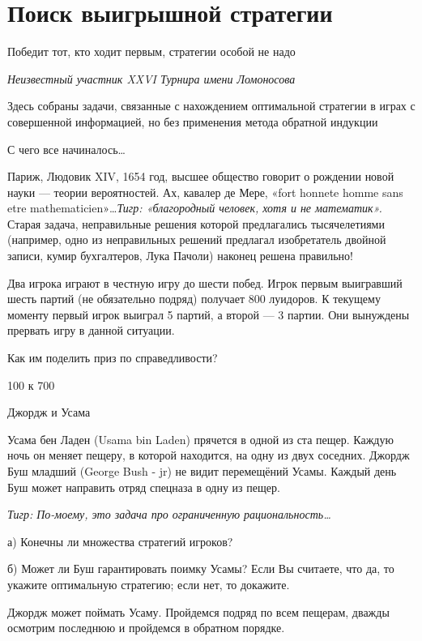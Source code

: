 



\section{Поиск выигрышной стратегии}
Победит тот, кто ходит первым, стратегии особой не надо

{\it Неизвестный участник  XXVI  Турнира имени Ломоносова}


Здесь собраны задачи, связанные с нахождением оптимальной стратегии в играх с совершенной информацией, но без применения метода обратной индукции


\begin{problem}
 С чего все начиналось\ldots \par
Париж, Людовик XIV, 1654 год, высшее общество говорит о рождении новой науки — теории вероятностей. Ах, кавалер де Мере, «fort honnete homme sans etre mathematicien»\ldots {\it Тигр:  «благородный человек, хотя и не математик».} Старая задача, неправильные решения которой предлагались тысячелетиями (например, одно из неправильных решений предлагал изобретатель двойной записи, кумир бухгалтеров, Лука Пачоли) наконец решена правильно!\par
Два игрока играют в честную игру до шести побед. Игрок первым выигравший шесть партий (не обязательно подряд) получает 800 луидоров. К текущему моменту первый игрок выиграл 5 партий, а второй — 3 партии. Они вынуждены прервать игру в данной ситуации.\par
Как им поделить приз по справедливости?



\begin{sol}
100 к 700
\end{sol}
\end{problem}





\begin{problem}
 Джордж и Усама\par
Усама бен Ладен (Usama bin Laden) прячется в одной из ста пещер. Каждую ночь он меняет пещеру, в которой находится, на одну из двух соседних. Джордж Буш младший (George Bush - jr) не видит перемещёний Усамы. Каждый день Буш может направить отряд спецназа в одну из пещер. \par
{\it Тигр: По-моему, это задача про ограниченную рациональность\ldots }\par
а)	Конечны ли множества стратегий игроков?\par
б)	Может ли Буш гарантировать поимку Усамы? Если Вы считаете, что да, то укажите оптимальную стратегию; если нет, то докажите.


\begin{sol}
Джордж может поймать Усаму. Пройдемся подряд по всем пещерам, дважды осмотрим последнюю и пройдемся в обратном порядке.
\end{sol}
\end{problem}




